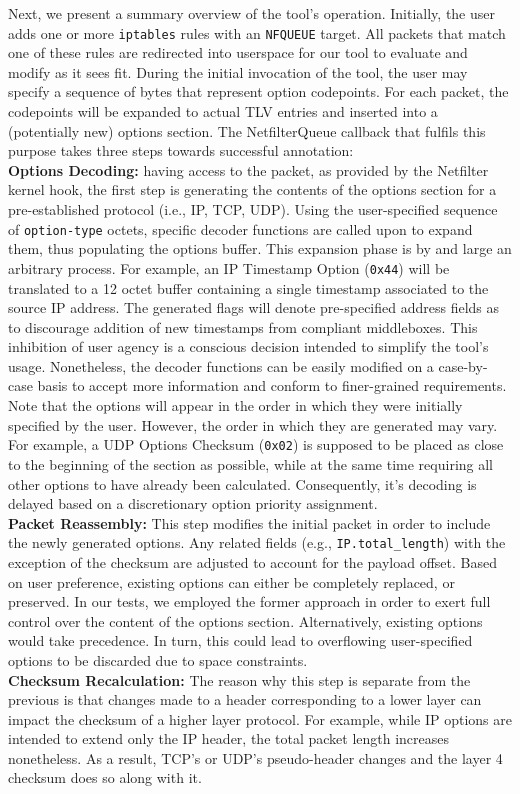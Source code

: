 Next, we present a summary overview of the tool's operation. Initially, the user adds one or more \texttt{iptables} rules with an \texttt{NFQUEUE} target. All packets that match one of these rules are redirected into userspace for our tool to evaluate and modify as it sees fit. During the initial invocation of the tool, the user may specify a sequence of bytes that represent option codepoints. For each packet, the codepoints will be expanded to actual TLV entries and inserted into a (potentially new) options section. The NetfilterQueue callback that fulfils this purpose takes three steps towards successful annotation:
\\ \textbf{Options Decoding:} having access to the packet, as provided by the Netfilter kernel hook, the first step is generating the contents of the options section for a pre-established protocol (i.e., IP, TCP, UDP). Using the user-specified sequence of \texttt{option-type} octets, specific decoder functions are called upon to expand them, thus populating the options buffer. This expansion phase is by and large an arbitrary process. For example, an IP Timestamp Option (\texttt{0x44}) will be translated to a 12 octet buffer containing a single timestamp associated to the source IP address. The generated flags will denote pre-specified address fields as to discourage addition of new timestamps from compliant middleboxes. This inhibition of user agency is a conscious decision intended to simplify the tool's usage. Nonetheless, the decoder functions can be easily modified on a case-by-case basis to accept more information and conform to finer-grained requirements. Note that the options will appear in the order in which they were initially specified by the user. However, the order in which they are generated may vary. For example, a UDP Options Checksum (\texttt{0x02}) is supposed to be placed as close to the beginning of the section as possible, while at the same time requiring all other options to have already been calculated. Consequently, it's decoding is delayed based on a discretionary option priority assignment.
\\ \textbf{Packet Reassembly:} This step modifies the initial packet in order to include the newly generated options. Any related fields (e.g., \texttt{IP.total\_length}) with the exception of the checksum are adjusted to account for the payload offset. Based on user preference, existing options can either be completely replaced, or preserved. In our tests, we employed the former approach in order to exert full control over the content of the options section. Alternatively, existing options would take precedence. In turn, this could lead to overflowing user-specified options to be discarded due to space constraints.
\\ \textbf{Checksum Recalculation:} The reason why this step is separate from the previous is that changes made to a header corresponding to a lower layer can impact the checksum of a higher layer protocol. For example, while IP options are intended to extend only the IP header, the total packet length increases nonetheless. As a result, TCP's or UDP's pseudo-header changes and the layer 4 checksum does so along with it.

